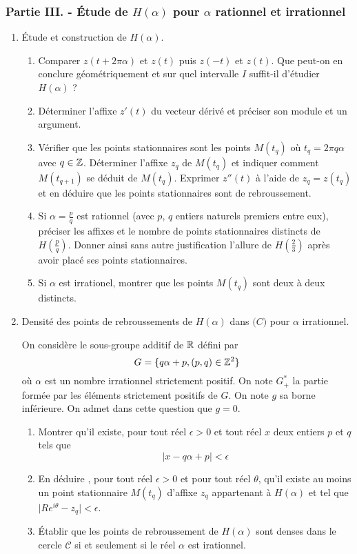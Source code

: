 \subsubsection*{Partie III. - {\'E}tude de $H(\alpha)$ pour $\alpha$ rationnel et irrationnel}
\begin{enumerate}
\item {\'E}tude et construction de $H(\alpha)$.

\begin{enumerate}
\item Comparer $z(t+2\pi\alpha)$ et $z(t)$ puis $z(-t)$ et $z(t)$. Que peut-on en conclure géométriquement et sur quel intervalle $I$ suffit-il d'étudier $H(\alpha)$ ?
\item Déterminer l'affixe $z'(t)$ du vecteur dérivé et préciser son module et un argument.
\item Vérifier que les points stationnaires sont les points $M(t_q)$ où $t_q=2\pi q \alpha$ avec $q\in \mathbb{Z}$.\newline
Déterminer l'affixe $z_q$ de $M(t_q)$ et indiquer comment $M(t_{q+1})$ se déduit de $M(t_q)$.\newline
Exprimer $z''(t)$ à l'aide de $z_q=z(t_q)$ et en déduire que les points stationnaires sont de rebroussement.
\item Si $\alpha=\frac{p}{q}$ est rationnel (avec $p$, $q$ entiers naturels premiers entre eux), préciser les affixes et le nombre de points stationnaires distincts de $H(\frac{p}{q})$.\newline
Donner ainsi sans autre justification l'allure de $H(\frac{2}{3})$ après avoir placé ses points stationnaires.
\item Si $\alpha$ est irrationel, montrer que les points $M(t_q)$ sont deux à deux distincts.
\end{enumerate}

\item Densité des points de rebroussements de $H(\alpha)$ dans $\mathcal(C)$ pour $\alpha$ irrationnel.

On considère le sous-groupe additif de $\mathbb{R}$ défini par
\[G=\{q\alpha + p , (p,q) \in \mathbb{Z}^2\}\]
où $\alpha$ est un nombre irrationnel strictement positif. On note $G_{+}^{*}$  la partie formée par les éléments strictement positifs de $G$. On note $g$ sa borne inférieure. On admet dans cette question que $g=0$.

\begin{enumerate}
\item Montrer qu'il existe, pour tout réel $\epsilon >0$ et tout réel $x$ deux entiers $p$ et $q$ tels que 
\[\vert x-q\alpha +p \vert <\epsilon\]
\item En déduire , pour tout réel $\epsilon >0$ et pour tout réel $\theta$, qu'il existe au moins un point stationnaire $M(t_q)$ d'affixe $z_q$ appartenant à $H(\alpha)$ et tel que $\vert R e^{i\theta}-z_q\vert<\epsilon$.
\item {\'E}tablir que les points de rebroussement de $H(\alpha)$ sont denses dans le cercle $\mathcal{C}$ si et seulement si le réel $\alpha$ est irationnel.
\end{enumerate}


\end{enumerate}

